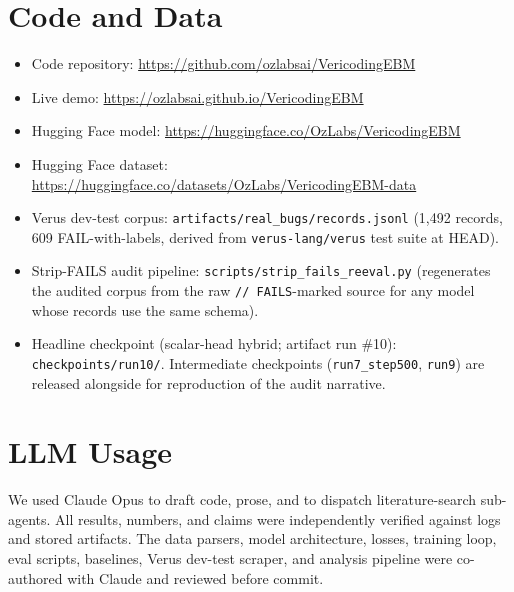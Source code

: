 \documentclass[10pt]{article}
\begin{document}
\section*{Code and Data}
\begin{itemize}[leftmargin=*,itemsep=2pt,topsep=2pt]
\item Code repository: \url{https://github.com/ozlabsai/VericodingEBM}
\item Live demo: \url{https://ozlabsai.github.io/VericodingEBM}
\item Hugging Face model: \url{https://huggingface.co/OzLabs/VericodingEBM}
\item Hugging Face dataset: \url{https://huggingface.co/datasets/OzLabs/VericodingEBM-data}
\item Verus dev-test corpus: \texttt{artifacts/real\_bugs/records.jsonl}
  (1{,}492 records, 609 FAIL-with-labels, derived from
  \texttt{verus-lang/verus} test suite at HEAD).
\item Strip-FAILS audit pipeline: \texttt{scripts/strip\_fails\_reeval.py}
  (regenerates the audited corpus from the raw \texttt{// FAILS}-marked
  source for any model whose records use the same schema).
\item Headline checkpoint (scalar-head hybrid; artifact run \#10):
  \texttt{checkpoints/run10/}. Intermediate checkpoints
  (\texttt{run7\_step500}, \texttt{run9}) are released alongside for
  reproduction of the audit narrative.
\end{itemize}

\section*{LLM Usage}
We used Claude Opus to draft code, prose, and to dispatch literature-search
sub-agents. All results, numbers, and claims were independently verified
against logs and stored artifacts. The data parsers, model architecture,
losses, training loop, eval scripts, baselines, Verus dev-test scraper, and
analysis pipeline were co-authored with Claude and reviewed before commit.
\end{document}
